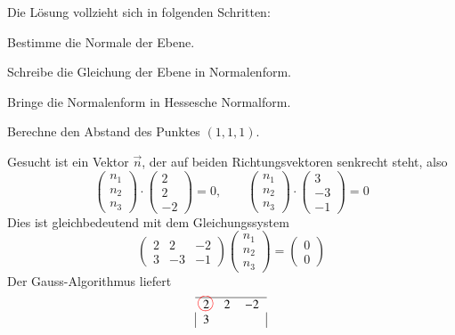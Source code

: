 \begin{beispiel}
{\parindent 0pt Die} Lösung vollzieht sich in folgenden Schritten:
\begin{compactenum}
\item Bestimme die Normale der Ebene.
\item Schreibe die Gleichung der Ebene in Normalenform.
\item Bringe die Normalenform in Hessesche Normalform.
\item Berechne den Abstand des Punktes $(1,1,1)$.
\end{compactenum}
Gesucht ist ein Vektor $\vec n$, der auf beiden
Richtungsvektoren senkrecht steht, also
\begin{equation}
\begin{pmatrix}n_1\\n_2\\n_3\end{pmatrix}
\cdot
\begin{pmatrix}2\\2\\-2\end{pmatrix}
=0,
\qquad
\begin{pmatrix}n_1\\n_2\\n_3\end{pmatrix}
\cdot
\begin{pmatrix}3\\-3\\-1\end{pmatrix}
=0
\label{gleichungen-fuer-normale}
\end{equation}
Dies ist gleichbedeutend mit dem Gleichungssystem
\[
\begin{pmatrix}
2&2&-2\\
3&-3&-1
\end{pmatrix}
\begin{pmatrix}n_1\\n_2\\n_3\end{pmatrix}
=\begin{pmatrix}0\\0 \end{pmatrix}
\]
Der Gauss-Algorithmus liefert
\begin{align*}
\begin{tabular}{|>{$}c<{$}>{$}c<{$}>{$}c<{$}|}
\hline
2%
\begin{picture}(0,0)
\color{red}\put(-3,4){\circle{12}}
\end{picture}%
&2&-2\\
3%
\begin{picture}(0,0)%

\end{picture}
\end{tabular}
\end{align*}
\end{beispiel}

